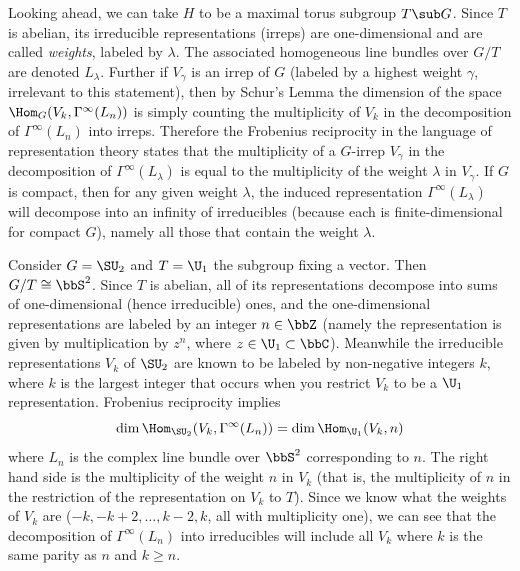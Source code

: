 \begin{example}
    Looking ahead, we can take $H$ to be a maximal torus subgroup $T\sub G$. Since $T$ is abelian, its irreducible representations (irreps) are one-dimensional and are called \emph{weights}, labeled by $\lambda$. The associated homogeneous line bundles over $G\slash T$ are denoted $L_\lambda$. Further if $V_\gamma$ is an irrep of $G$ (labeled by a highest weight $\gamma$, irrelevant to this statement), then by Schur's Lemma the dimension of the space $\Hom_G(V_k,\Gamma^\infty(L_n))$ is simply counting the multiplicity of $V_k$ in the decomposition of $\Gamma^\infty(L_n)$ into irreps. Therefore the Frobenius reciprocity in the language of representation theory states that the multiplicity of a $G$-irrep $V_\gamma$ in the decomposition of $\Gamma^\infty(L_\lambda)$ is equal to the multiplicity of the weight $\lambda$ in $V_\gamma$. If $G$ is compact, then for any given weight $\lambda$, the induced representation $\Gamma^\infty(L_\lambda)$ will decompose into an infinity of irreducibles (because each is finite-dimensional for compact $G$), namely all those that contain the weight $\lambda$.

    Consider $G=\SU_2$ and $T=\U_1$ the subgroup fixing a vector. Then $G\slash T\cong \bbS^2$. Since $T$ is abelian, all of its representations decompose into sums of one-dimensional (hence irreducible) ones, and the one-dimensional representations are labeled by an integer $n\in\bbZ$ (namely the representation is given by multiplication by $z^n$, where $z\in\U_1\subset \bbC$). Meanwhile the irreducible representations $V_k$ of $\SU_2$ are known to be labeled by non-negative integers $k$, where $k$ is the largest integer that occurs when you restrict $V_k$ to be a $\U_1$ representation. Frobenius reciprocity implies
    \[\dim\Hom_{\SU_2}(V_k,\Gamma^\infty(L_n))=\dim \Hom_{\U_1}(V_k,n)\]
    where $L_n$ is the complex line bundle over $\bbS^2$ corresponding to $n$. The right hand side is the multiplicity of the weight $n$ in $V_k$ (that is, the multiplicity of $n$ in the restriction of the representation on $V_k$ to $T$). Since we know what the weights of $V_k$ are ($-k,-k+2,\ldots,k-2,k$, all with multiplicity one), we can see that the decomposition of $\Gamma^\infty(L_n)$ into irreducibles will include all $V_k$ where $k$ is the same parity as $n$ and $k\geq n$.


\end{example}
